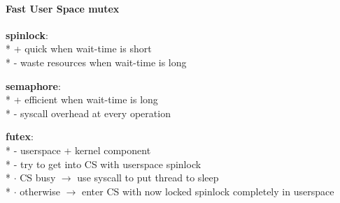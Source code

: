 \paragraph{Fast User Space mutex}
\begin{items}
  \item \textbf{spinlock}: \\*
    + quick when wait-time is short \\*
    - waste resources when wait-time is long
  \item \textbf{semaphore}: \\*
    + efficient when wait-time is long \\*
    - syscall overhead at every operation
  \item \textbf{futex}: \\*
    - userspace + kernel component \\*
    - try to get into CS with userspace spinlock \\*
    \phantom{-} \( \cdot \) CS busy \( \to \) use syscall to put thread to sleep \\*
    \phantom{-} \( \cdot \) otherwise \( \to \) enter CS with now locked spinlock completely in userspace
\end{items}